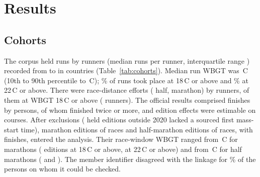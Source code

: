 \documentclass[12pt]{article}
\newcommand{\degC}{\,\textdegree C}
\begin{document}
\section{Results}
\subsection{Cohorts}
The corpus held \nRuns{} runs by \nRunners{} runners (median \runsPerRunnerMed{} runs per runner, interquartile range \runsPerRunnerIQR) recorded from \corpusFirst{} to \corpusLast{} in \nCountries{} countries (Table~\ref{tab:cohorts}). Median run WBGT was \wbgtMed\degC{} (10th to 90th percentile \wbgtPten{} to \wbgtPninety\degC); \shareEighteen\% of runs took place at 18\degC{} or above and \shareTwentytwo\% at 22\degC{} or above. There were \nEfforts{} race-distance efforts (\nEffHalf{} half, \nEffMar{} marathon) by \nEffRunners{} runners, \nEffHot{} of them at WBGT 18\degC{} or above (\nEffHotRunners{} runners). The official results comprised \nFinishes{} finishes by \nPersons{} persons, \nRepeaters{} of whom finished twice or more, and edition effects were estimable on \nCoursesEff{} courses. After exclusions (\nNoStart{} held editions outside 2020 lacked a sourced first mass-start time), \nEdMar{} marathon editions of \nRacesMar{} races and \nEdHalf{} half-marathon editions of \nRacesHalf{} races, with \nFinAnalysis{} finishes, entered the analysis. Their race-window WBGT ranged from \wbgtRangeMar\degC{} for marathons (\edMarEighteen{} editions at 18\degC{} or above, \edMarTwentytwo{} at 22\degC{} or above) and from \wbgtRangeHalf\degC{} for half marathons (\edHalfEighteen{} and \edHalfTwentytwo). The member identifier disagreed with the linkage for \falseLink\% of the persons on whom it could be checked.
\end{document}
